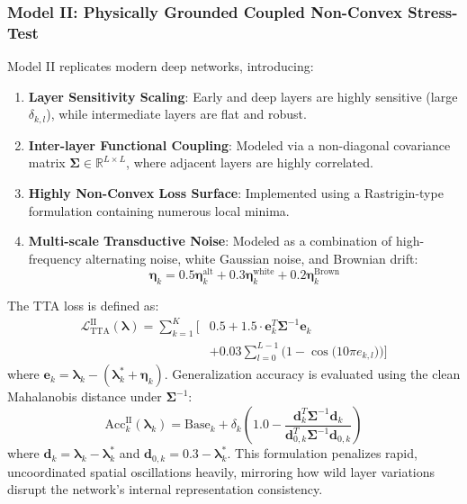 \subsubsection{Model II: Physically Grounded Coupled Non-Convex Stress-Test}
Model II replicates modern deep networks, introducing:
\begin{enumerate}
    \item \textbf{Layer Sensitivity Scaling}: Early and deep layers are highly sensitive (large $\delta_{k, l}$), while intermediate layers are flat and robust.
    \item \textbf{Inter-layer Functional Coupling}: Modeled via a non-diagonal covariance matrix $\boldsymbol{\Sigma} \in \mathbb{R}^{L \times L}$, where adjacent layers are highly correlated.
    \item \textbf{Highly Non-Convex Loss Surface}: Implemented using a Rastrigin-type formulation containing numerous local minima.
    \item \textbf{Multi-scale Transductive Noise}: Modeled as a combination of high-frequency alternating noise, white Gaussian noise, and Brownian drift:
    \begin{equation}
    \boldsymbol{\eta}_k = 0.5 \boldsymbol{\eta}_k^{\text{alt}} + 0.3 \boldsymbol{\eta}_k^{\text{white}} + 0.2 \boldsymbol{\eta}_k^{\text{Brown}}
    \end{equation}
\end{enumerate}
The TTA loss is defined as:
\begin{equation}
\label{eq:model2_loss}
\begin{split}
\mathcal{L}_{\text{TTA}}^{\text{II}}(\boldsymbol{\lambda}) = \sum_{k=1}^K \bigg[ &0.5 + 1.5 \cdot \mathbf{e}_k^T \boldsymbol{\Sigma}^{-1} \mathbf{e}_k \\
&+ 0.03 \sum_{l=0}^{L-1} \Big( 1 - \cos\big(10 \pi e_{k, l}\big) \Big) \bigg]
\end{split}
\end{equation}
where $\mathbf{e}_k = \boldsymbol{\lambda}_k - (\boldsymbol{\lambda}^*_k + \boldsymbol{\eta}_k)$. Generalization accuracy is evaluated using the clean Mahalanobis distance under $\boldsymbol{\Sigma}^{-1}$:
\begin{equation}
\text{Acc}_k^{\text{II}}(\boldsymbol{\lambda}_k) = \text{Base}_k + \delta_k \left( 1.0 - \frac{\mathbf{d}_k^T \boldsymbol{\Sigma}^{-1} \mathbf{d}_k}{\mathbf{d}_{0, k}^T \boldsymbol{\Sigma}^{-1} \mathbf{d}_{0, k}} \right)
\end{equation}
where $\mathbf{d}_k = \boldsymbol{\lambda}_k - \boldsymbol{\lambda}^*_k$ and $\mathbf{d}_{0, k} = \mathbf{0.3} - \boldsymbol{\lambda}^*_k$. This formulation penalizes rapid, uncoordinated spatial oscillations heavily, mirroring how wild layer variations disrupt the network's internal representation consistency.

